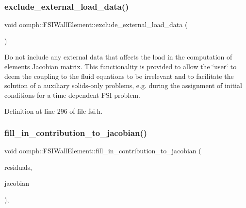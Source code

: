\subsubsection{\texorpdfstring{exclude\+\_\+external\+\_\+load\+\_\+data()}{exclude\_external\_load\_data()}}
{\footnotesize\ttfamily void oomph\+::\+F\+S\+I\+Wall\+Element\+::exclude\+\_\+external\+\_\+load\+\_\+data (\begin{DoxyParamCaption}{ }\end{DoxyParamCaption})\hspace{0.3cm}{\ttfamily [inline]}}



Do not include any external data that affects the load in the computation of element\textquotesingle{}s Jacobian matrix. This functionality is provided to allow the \char`\"{}user\char`\"{} to deem the coupling to the fluid equations to be irrelevant and to facilitate the solution of a auxiliary solids-\/only problems, e.\+g. during the assignment of initial conditions for a time-\/dependent F\+SI problem. 



Definition at line 296 of file fsi.\+h.

\mbox{\label{classoomph_1_1FSIWallElement_a7817d2662c24540d3757cb1a1194a635}} 
\subsubsection{\texorpdfstring{fill\+\_\+in\+\_\+contribution\+\_\+to\+\_\+jacobian()}{fill\_in\_contribution\_to\_jacobian()}}
{\footnotesize\ttfamily void oomph\+::\+F\+S\+I\+Wall\+Element\+::fill\+\_\+in\+\_\+contribution\+\_\+to\+\_\+jacobian (\begin{DoxyParamCaption}\item[{\hyperlink{classoomph_1_1Vector}{Vector}$<$ double $>$ \&}]{residuals,  }\item[{\hyperlink{classoomph_1_1DenseMatrix}{Dense\+Matrix}$<$ double $>$ \&}]{jacobian }\end{DoxyParamCaption})\hspace{0.3cm}{\ttfamily [inline]}, {\ttfamily [virtual]}}

